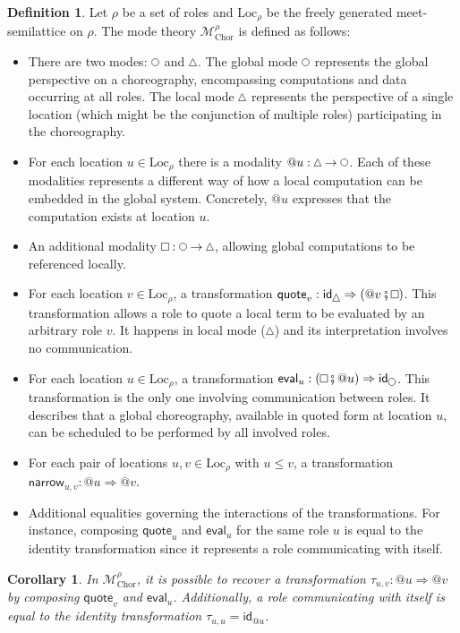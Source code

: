 \documentclass{scrartcl}
\theoremstyle{definition}
\newtheorem{definition}{Definition}
\theoremstyle{plain}
\newtheorem{corollary}{Corollary}
\renewcommand{\square}%
  {\tikz{\draw (0,0) rectangle (0.2cm,0.2cm);}}
\renewcommand{\circle}%
  {\tikz{\draw (0,0) circle [radius=0.1cm];}}
\renewcommand{\triangle}%
  {\tikz{\draw (0,0) -- (0.2cm,0) -- (0.1cm,0.2cm) -- (0,0);}}
\begin{document}
\begin{definition}
Let $\rho$ be a set of roles and $\textrm{Loc}_\rho$ be the freely generated
meet-semilattice on $\rho$. The mode theory $\mathcal{M}^\rho_{\textrm{Chor}}$
is defined as follows:
\begin{itemize}
\item
  There are two modes: $\circle$ and $\triangle$. The global mode $\circle$
  represents the global perspective on a choreography, encompassing
  computations and data occurring at all roles. The local mode $\triangle$
  represents the perspective of a single location (which might be the
  conjunction of multiple roles) participating in the choreography.
\item
  For each location $u \in \textrm{Loc}_\rho$ there is a modality $@u :
  \triangle \to \circle$. Each of these modalities represents a different way
  of how a local computation can be embedded in the global system. Concretely,
  $@u$ expresses that the computation exists at location $u$.
\item
  An additional modality $\square : \circle \to \triangle$, allowing global
  computations to be referenced locally.
\item
  For each location $v \in \textrm{Loc}_\rho$, a transformation
  $\textsf{quote}_v : \textsf{id}_{\triangle} \Rightarrow ({}@ v \fatsemi
  \square)$. This transformation allows a role to quote a local term to be
  evaluated by an arbitrary role $v$. It happens in local mode ($\triangle$)
  and its interpretation involves no communication.
\item
  For each location $u \in \textrm{Loc}_\rho$, a transformation
  $\textsf{eval}_u : (\square \fatsemi {}@ u) \Rightarrow
  \textsf{id}_{\circle}$. This transformation is the only one involving
  communication between roles. It describes that a global choreography,
  available in quoted form at location $u$, can be scheduled to be performed by
  all involved roles.
\item
  For each pair of locations $u, v \in \textrm{Loc}_\rho$ with $u \leq v$, a
  transformation $\textsf{narrow}_{u,v} : @u \Rightarrow @v$.
\item
  Additional equalities governing the interactions of the transformations. For
  instance, composing $\textsf{quote}_u$ and $\textsf{eval}_u$ for the same
  role $u$ is equal to the identity transformation since it represents a
  role communicating with itself.
\end{itemize}
\end{definition}
\begin{corollary}
  In {\upshape$\mathcal{M}^{\rho}_{\textrm{Chor}}$}, it is possible to recover
  a transformation $\tau_{u,v} : @u \Rightarrow @v$ by composing
  {\upshape$\textsf{quote}_v$} and {\upshape$\textsf{eval}_u$}. Additionally, a
  role communicating with itself is equal to the identity transformation
  {\upshape$\tau_{u,u} = \textsf{id}_{@u}$}.
\end{corollary}
\end{document}
